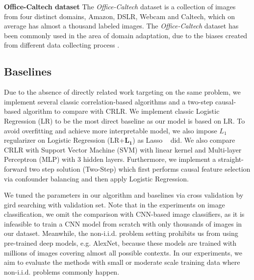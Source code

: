 \documentclass[sigconf]{acmart}
\begin{document}
\textbf{Office-Caltech dataset}
The \emph{Office-Caltech} dataset is a collection of images from four distinct domains, Amazon, DSLR, Webcam and Caltech, which on average has almost a thousand labeled images.
The \emph{Office-Caltech} dataset has been commonly used in the area of domain adaptation, due to the biases created from different data collecting process \cite{torralba2011unbiased}.

\subsection{Baselines}
Due to the absence of directly related work targeting on the same problem, we implement several classic correlation-based algorithms and a two-step causal-based algorithm  to compare with CRLR.
We implement classic Logistic Regression (LR) to be the most direct baseline as our model is based on LR.
To avoid overfitting and achieve more interpretable model, we also impose $L_1$ regularizer on Logistic Regression (LR+$\bm{L_1}$) as Lasso ~\cite{tibshirani1996regression} did.
We also compare CRLR with Support Vector Machine (SVM) with linear kernel and  Multi-layer Perceptron (MLP) with 3 hidden layers.
Furthermore, we implement a straight-forward two step solution (Two-Step) which first performs causal feature selection via confounder balancing \cite{athey2016approximate} and then apply Logistic Regression.

We tuned the parameters in our algorithm and baselines via cross validation by gird searching with validation set. 
Note that in the experiments on image classification, we omit the comparison with CNN-based image classifiers, as it is infeasible to train a CNN model from scratch with only thousands of images in our dataset. 
Meanwhile, the non-i.i.d. problem setting prohibits us from using pre-trained deep models, e.g. AlexNet, because these models are trained with millions of images covering almost all possible contexts. 
In our experiments, we aim to evaluate the methods with small or moderate scale training data where non-i.i.d. problems commonly happen.
\end{document}
